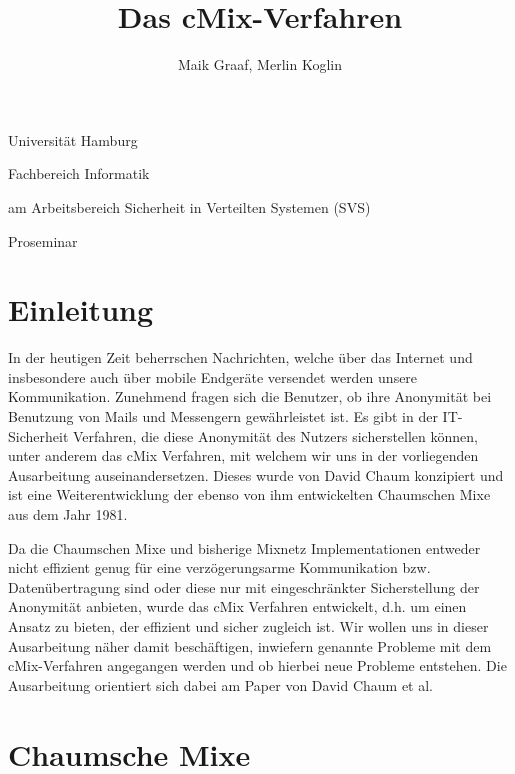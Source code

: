 \documentclass[
    fontsize=12pt,
    headings=small,
    parskip=half,           %
    bibliography=totoc,
    numbers=noenddot,       %
    open=any,               %
    final                   %
    ]{scrreprt}
\title{Das cMix-Verfahren}
\author{Maik Graaf, Merlin Koglin}
\begin{document}
\begin{titlepage}
\begin{center}\Large
    Universität Hamburg \par
    Fachbereich Informatik
    \vfill
    \makeatletter
    {\Large\textsf{\textbf{\@title}}\par}
    \makeatother
    \bigskip
    am Arbeitsbereich Sicherheit in Verteilten Systemen (SVS) \par
    \bigskip
    \makeatletter
    {\@author} \par
    \makeatother
    \bigskip
    \makeatletter
    {\@date}
    \makeatother
    \vfill
    \vfill
    {Proseminar}

\end{center}
\end{titlepage}

\tableofcontents

\chapter{Einleitung}

In der heutigen Zeit beherrschen Nachrichten, welche über das Internet und insbesondere auch über mobile Endgeräte versendet werden unsere Kommunikation.
Zunehmend fragen sich die Benutzer, ob ihre Anonymität bei
Benutzung von Mails und Messengern gewährleistet ist.
 Es gibt in der IT-Sicherheit Verfahren, die diese Anonymität des Nutzers sicherstellen können, unter anderem das cMix Verfahren, mit welchem wir uns in der
vorliegenden Ausarbeitung auseinandersetzen. Dieses
wurde von David Chaum konzipiert und ist eine
Weiterentwicklung der ebenso von ihm entwickelten Chaumschen Mixe aus dem Jahr
1981.

Da die Chaumschen Mixe und bisherige Mixnetz Implementationen entweder nicht effizient genug für eine verzögerungsarme Kommunikation bzw. Datenübertragung sind oder diese nur mit eingeschränkter Sicherstellung der Anonymität anbieten, 
wurde das cMix Verfahren entwickelt, d.h. um einen Ansatz zu bieten, der effizient und sicher zugleich ist.
Wir wollen uns in dieser Ausarbeitung
näher damit beschäftigen, inwiefern genannte Probleme mit dem cMix-Verfahren angegangen werden
und ob hierbei neue Probleme entstehen.
Die Ausarbeitung orientiert sich dabei am Paper \cite{DBLP:journals/iacr/DavidChaumJKKRS16} von David Chaum et al.


\chapter{Chaumsche Mixe}
\end{document}
